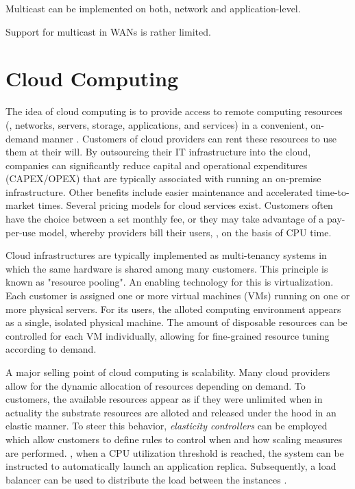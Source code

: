 Multicast can be implemented on both, network and application-level.

Support for multicast in WANs is rather limited.


%
%
%
%
%
%
%
%
%
%

\section{Cloud Computing}

The idea of cloud computing is to provide access to remote computing resources  (\eg , networks, servers, storage, applications, and services) in a convenient, on-demand manner \cite{mell2011nist}. Customers of cloud providers can rent these resources to use them at their will. By outsourcing their IT infrastructure into the cloud, companies can significantly reduce capital and operational expenditures (CAPEX/OPEX) that are typically associated with running an on-premise infrastructure. Other benefits include easier maintenance and accelerated time-to-market times. Several pricing models for cloud services exist. Customers often have the choice between a set monthly fee, or they may take advantage of a pay-per-use model, whereby providers bill their users, \eg , on the basis of CPU time.

Cloud infrastructures are typically implemented as multi-tenancy systems in which the same hardware is shared among many customers. This principle is known as "resource pooling". An enabling technology for this is virtualization. Each customer is assigned one or more virtual machines (VMs) running on one or more physical servers. For its users, the alloted computing environment appears as a single, isolated physical machine. The amount of disposable resources can be controlled for each VM individually, allowing for fine-grained resource tuning according to demand.

A major selling point of cloud computing is scalability. Many cloud providers allow for the dynamic allocation of resources depending on demand. To customers, the available resources appear as if they were unlimited when in actuality the substrate resources are alloted and released under the hood in an elastic manner. To steer this behavior, \emph{elasticity controllers} can be employed which allow customers to define rules to control when and how scaling measures are performed. \Eg , when a CPU utilization threshold is reached, the system can be instructed to automatically launch an application replica. Subsequently, a load balancer can be used to distribute the load between the instances \cite{vaquero2011dynamically}.


